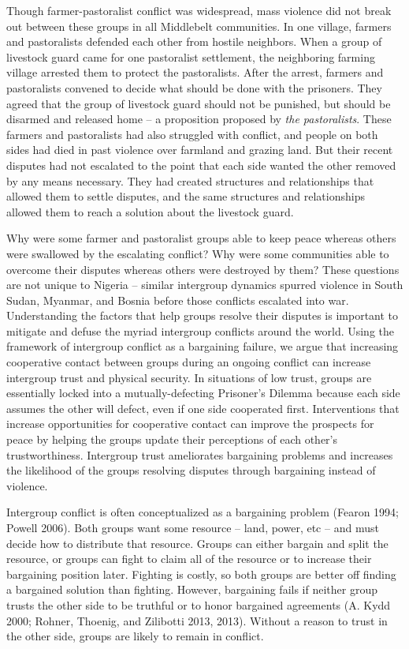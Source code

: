 \documentclass[11pt]{article}
\begin{document}
Though farmer-pastoralist conflict was widespread, mass violence did not
break out between these groups in all Middlebelt communities. In one
village, farmers and pastoralists defended each other from hostile
neighbors. When a group of livestock guard came for one pastoralist
settlement, the neighboring farming village arrested them to protect the
pastoralists. After the arrest, farmers and pastoralists convened to
decide what should be done with the prisoners. They agreed that the
group of livestock guard should not be punished, but should be disarmed
and released home -- a proposition proposed by \emph{the pastoralists}.
These farmers and pastoralists had also struggled with conflict, and
people on both sides had died in past violence over farmland and grazing
land. But their recent disputes had not escalated to the point that each
side wanted the other removed by any means necessary. They had created
structures and relationships that allowed them to settle disputes, and
the same structures and relationships allowed them to reach a solution
about the livestock guard.

Why were some farmer and pastoralist groups able to keep peace whereas
others were swallowed by the escalating conflict? Why were some
communities able to overcome their disputes whereas others were
destroyed by them? These questions are not unique to Nigeria -- similar
intergroup dynamics spurred violence in South Sudan, Myanmar, and Bosnia
before those conflicts escalated into war. Understanding the factors
that help groups resolve their disputes is important to mitigate and
defuse the myriad intergroup conflicts around the world. Using the
framework of intergroup conflict as a bargaining failure, we argue that
increasing cooperative contact between groups during an ongoing conflict
can increase intergroup trust and physical security. In situations of
low trust, groups are essentially locked into a mutually-defecting
Prisoner's Dilemma because each side assumes the other will defect, even
if one side cooperated first. Interventions that increase opportunities
for cooperative contact can improve the prospects for peace by helping
the groups update their perceptions of each other's trustworthiness.
Intergroup trust ameliorates bargaining problems and increases the
likelihood of the groups resolving disputes through bargaining instead
of violence.

Intergroup conflict is often conceptualized as a bargaining problem
(Fearon 1994; Powell 2006). Both groups want some resource -- land,
power, etc -- and must decide how to distribute that resource. Groups
can either bargain and split the resource, or groups can fight to claim
all of the resource or to increase their bargaining position later.
Fighting is costly, so both groups are better off finding a bargained
solution than fighting. However, bargaining fails if neither group
trusts the other side to be truthful or to honor bargained agreements
(A. Kydd 2000; Rohner, Thoenig, and Zilibotti 2013, 2013). Without a
reason to trust in the other side, groups are likely to remain in
conflict.
\end{document}
